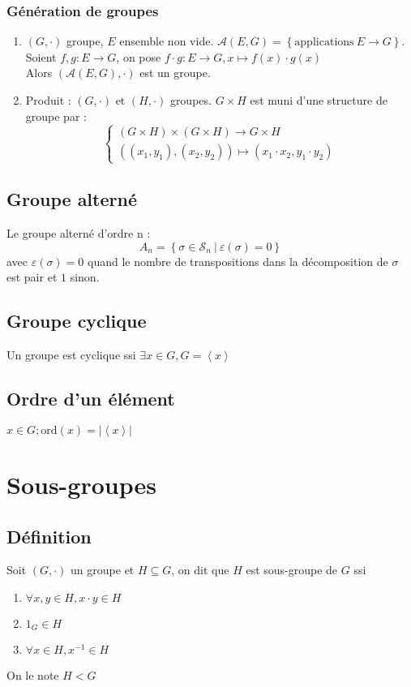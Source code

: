 \documentclass[a4paper,10pt]{report}
\newcommand{\grp}[1]{\left\langle #1 \right\rangle} %
\newcommand{\set}[1]{\left\lbrace #1 \right\rbrace } %
\newcommand{\ord}{\mathrm{ord}} %
\newcommand{\such}{\ \Big| \ }
\begin{document}
   \subsection{Génération de groupes}
    \begin{enumerate}
      \item $(G,\cdot)$ groupe, $E$ ensemble non vide.
	$\mathcal{A}(E,G)=\set{\mathrm{applications} \  E \to G}$.\\
        Soient $f,g: E \to G$, on pose
	$f \cdot g : E \to G, x \mapsto f(x) \cdot g(x)$\\
        Alors $(\mathcal{A}(E,G), \cdot)$ est un groupe.
      \item Produit : $(G, \cdot)$ et $(H, \cdot)$ groupes. 
	$G \times H$ est muni d'une structure de groupe par :
        $$
        \begin{cases}
          (G \times H) \times (G \times H) \to G \times H\\
          ((x_1,y_1),(x_2,y_2)) \mapsto (x_1 \cdot x_2, y_1 \cdot y_2)
        \end{cases}$$
    \end{enumerate}

  \section{Groupe alterné}
   Le groupe alterné d'ordre n :
   $$A_n=\set{\sigma \in \mathcal{S}_n \such \varepsilon(\sigma)=0}$$
   avec $\varepsilon(\sigma)=0$ quand le nombre de transpositions dans la
   décomposition de $\sigma$ est pair et $1$ sinon.
  \section{Groupe cyclique}
   Un groupe est cyclique ssi $\exists x \in G, G= \grp{x}$

  \section{Ordre d'un élément}
   $x \in G; \ord(x) = |\grp{x}|$
 \chapter{Sous-groupes}
  \section{Définition}
   Soit $(G, \cdot)$ un groupe et $H \subseteq G$, on dit que $H$ est
   sous-groupe de $G$ ssi
   \begin{enumerate}
     \item $\forall x,y \in H, x \cdot y \in H$
     \item $1_G \in H$
     \item $\forall x \in H, x^{-1} \in H$
   \end{enumerate}
   On le note $H < G$
\end{document}
